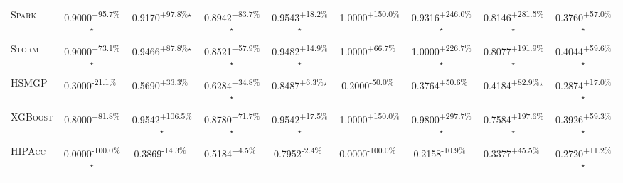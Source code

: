 \begin{table}[htbp]
\begin{tabular}{l|cccc|cccc}
\textsc{Spark} & \cellcolor{green!30}0.9000\textsuperscript{+95.7\%}$^\star$ & \cellcolor{green!30}0.9170\textsuperscript{+97.8\%}$^\star$ & \cellcolor{green!30}0.8942\textsuperscript{+83.7\%}$^\star$ & \cellcolor{green!30}0.9543\textsuperscript{+18.2\%}$^\star$ & \cellcolor{green!30}1.0000\textsuperscript{+150.0\%}$^{\,\,\,}$ & \cellcolor{green!30}0.9316\textsuperscript{+246.0\%}$^\star$ & \cellcolor{green!30}0.8146\textsuperscript{+281.5\%}$^\star$ & \cellcolor{green!30}0.3760\textsuperscript{+57.0\%}$^\star$ \\
\textsc{Storm} & \cellcolor{green!30}0.9000\textsuperscript{+73.1\%}$^\star$ & \cellcolor{green!30}0.9466\textsuperscript{+87.8\%}$^\star$ & \cellcolor{green!30}0.8521\textsuperscript{+57.9\%}$^\star$ & \cellcolor{green!30}0.9482\textsuperscript{+14.9\%}$^\star$ & \cellcolor{green!30}1.0000\textsuperscript{+66.7\%}$^{\,\,\,}$ & \cellcolor{green!30}1.0000\textsuperscript{+226.7\%}$^\star$ & \cellcolor{green!30}0.8077\textsuperscript{+191.9\%}$^\star$ & \cellcolor{green!30}0.4044\textsuperscript{+59.6\%}$^\star$ \\
\textsc{HSMGP} & \cellcolor{red!30}0.3000\textsuperscript{-21.1\%}$^{\,\,\,}$ & \cellcolor{green!30}0.5690\textsuperscript{+33.3\%}$^{\,\,\,}$ & \cellcolor{green!30}0.6284\textsuperscript{+34.8\%}$^\star$ & \cellcolor{green!30}0.8487\textsuperscript{+6.3\%}$^\star$ & \cellcolor{red!30}0.2000\textsuperscript{-50.0\%}$^{\,\,\,}$ & \cellcolor{green!30}0.3764\textsuperscript{+50.6\%}$^{\,\,\,}$ & \cellcolor{green!30}0.4184\textsuperscript{+82.9\%}$^\star$ & \cellcolor{green!30}0.2874\textsuperscript{+17.0\%}$^\star$ \\
\textsc{XGBoost} & \cellcolor{green!30}0.8000\textsuperscript{+81.8\%}$^{\,\,\,}$ & \cellcolor{green!30}0.9542\textsuperscript{+106.5\%}$^\star$ & \cellcolor{green!30}0.8780\textsuperscript{+71.7\%}$^\star$ & \cellcolor{green!30}0.9542\textsuperscript{+17.5\%}$^\star$ & \cellcolor{green!30}1.0000\textsuperscript{+150.0\%}$^{\,\,\,}$ & \cellcolor{green!30}0.9800\textsuperscript{+297.7\%}$^\star$ & \cellcolor{green!30}0.7584\textsuperscript{+197.6\%}$^\star$ & \cellcolor{green!30}0.3926\textsuperscript{+59.3\%}$^\star$ \\
\textsc{HIPAcc} & \cellcolor{red!30}0.0000\textsuperscript{-100.0\%}$^\star$ & \cellcolor{red!30}0.3869\textsuperscript{-14.3\%}$^{\,\,\,}$ & \cellcolor{green!30}0.5184\textsuperscript{+4.5\%}$^{\,\,\,}$ & \cellcolor{red!30}0.7952\textsuperscript{-2.4\%}$^{\,\,\,}$ & \cellcolor{red!30}0.0000\textsuperscript{-100.0\%}$^{\,\,\,}$ & \cellcolor{red!30}0.2158\textsuperscript{-10.9\%}$^{\,\,\,}$ & \cellcolor{green!30}0.3377\textsuperscript{+45.5\%}$^{\,\,\,}$ & \cellcolor{green!30}0.2720\textsuperscript{+11.2\%}$^\star$ \\

\end{tabular}
\end{table}

